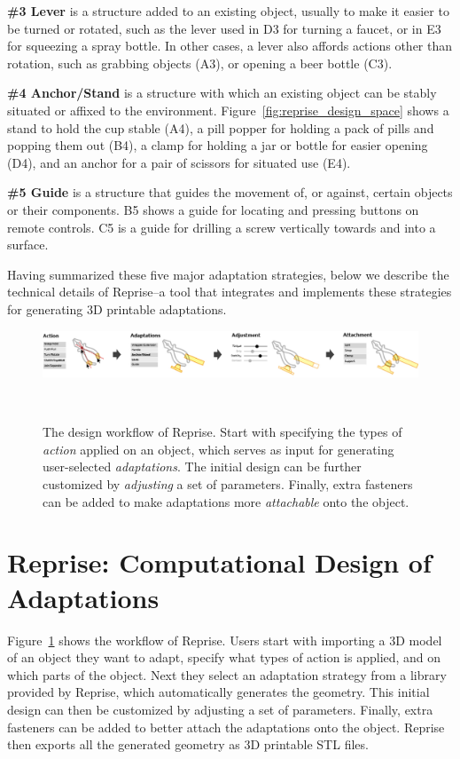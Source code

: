 \textbf{\#3 Lever} is a structure added to an existing object, usually to make it easier to be turned or rotated, such as the lever used in D3 for turning a faucet, or in E3 for squeezing a spray bottle. In other cases, a lever also affords actions other than rotation, such as grabbing objects (A3), or opening a beer bottle (C3).

\textbf{\#4 Anchor/Stand} is a structure with which an existing object can be stably situated or affixed to the environment. Figure~\ref{fig:reprise_design_space} shows a stand to hold the cup stable (A4), a pill popper for holding a pack of pills and popping them out (B4), a clamp for holding a jar or bottle for easier opening (D4), and an anchor for a pair of scissors for situated use (E4).

\textbf{\#5 Guide} is a structure that guides the movement of, or against, certain objects or their components. B5 shows a guide for locating and pressing buttons on remote controls. C5 is a guide for drilling a screw vertically towards and into a surface. 

Having summarized these five major adaptation strategies, below we describe the technical details of Reprise--a tool that integrates and implements these strategies for generating 3D printable adaptations.

\begin{figure}
  \centering
  \includegraphics[width=1\textwidth]{figures/reprise_sys_overview_v1.pdf}
  \caption{The design workflow of Reprise. Start with specifying the types of \textit{action} applied on an object, which serves as input for generating user-selected \textit{adaptations}. The initial design can be further customized by \textit{adjusting} a set of parameters. Finally, extra fasteners can be added to make adaptations more \textit{attachable} onto the object.}~\label{fig:reprise_sys_overview}
\end{figure}

\section{Reprise: Computational Design of Adaptations}
Figure~\ref{fig:reprise_sys_overview} shows the workflow of Reprise. Users start with importing a 3D model of an object they want to adapt, specify what types of action is applied, and on which parts of the object. Next they select an adaptation strategy from a library provided by Reprise, which automatically generates the geometry. This initial design can then be customized by adjusting a set of parameters. Finally, extra fasteners can be added to better attach the adaptations onto the object. Reprise then exports all the generated geometry as 3D printable STL files.

